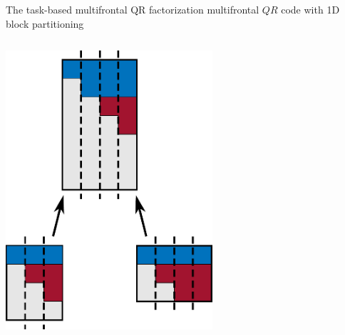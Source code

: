 \begin{frame}[fragile,t]{The task-based multifrontal QR factorization}
   multifrontal $QR$ code with 1D block partitioning

  \begin{columns}[t]
    \begin{column}{0.45\textwidth}
      \begin{center}
        \includegraphics[width=0.6\textwidth]{figures/tree_part}
      \end{center}
    \end{column}
    \begin{column}{0.55\textwidth}
      
    \end{column}
  \end{columns}
\end{frame}

